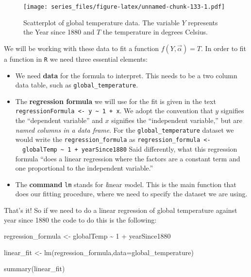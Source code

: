 \documentclass[
]{book}
\newenvironment{Shaded}{\begin{snugshade}}{\end{snugshade}}
\newcommand{\AttributeTok}[1]{\textcolor[rgb]{0.77,0.63,0.00}{#1}}
\newcommand{\DecValTok}[1]{\textcolor[rgb]{0.00,0.00,0.81}{#1}}
\newcommand{\FunctionTok}[1]{\textcolor[rgb]{0.00,0.00,0.00}{#1}}
\newcommand{\NormalTok}[1]{#1}
\newcommand{\OtherTok}[1]{\textcolor[rgb]{0.56,0.35,0.01}{#1}}
\newcommand{\SpecialCharTok}[1]{\textcolor[rgb]{0.00,0.00,0.00}{#1}}
\providecommand{\tightlist}{%
  \setlength{\itemsep}{0pt}\setlength{\parskip}{0pt}}
\theoremstyle{definition}
\theoremstyle{definition}
\theoremstyle{definition}
\theoremstyle{remark}
\begin{document}
\begin{figure}
\centering
\texttt{[image: series\_files/figure-latex/unnamed-chunk-133-1.pdf]}
\caption{\label{fig:unnamed-chunk-133}Scatterplot of global temperature data. The variable \(Y\) represents the Year since 1880 and \(T\) the temperature in degrees Celsius.}
\end{figure}

We will be working with these data to fit a function \(f(Y,\vec{\alpha})=T\). In order to fit a function in \texttt{R} we need three essential elements:

\begin{itemize}
\tightlist
\item
  We need \textbf{data} for the formula to interpret. This needs to be a two column data table, such as \texttt{global\_temperature}.
\item
  The \textbf{regression formula} we will use for the fit is given in the text \texttt{regressionFormula\ \textless{}-\ y\ \textasciitilde{}\ 1\ +\ x}. We adopt the convention that \(y\) signifies the ``dependent variable'' and \(x\) signifies the ``independent variable,'' but are \emph{named columns in a data frame}. For the \texttt{global\_temperature} dataset we would write the \texttt{regression\_formula} as \texttt{regression\_formula\ \textless{}-\ \ globalTemp\ \textasciitilde{}\ 1\ +\ yearSince1880} Said differently, what this regression formula ``does a linear regression where the factors are a constant term and one proportional to the independent variable.''
\item
  The \textbf{command} \texttt{lm} stands for \emph{l}inear \emph{m}odel. This is the main function that does our fitting procedure, where we need to specify the dataset we are using.
\end{itemize}

That's it! So if we need to do a linear regression of global temperature against year since 1880 the code to do this is the following:

\begin{Shaded}
\begin{Highlighting}[]
\NormalTok{regression\_formula }\OtherTok{\textless{}{-}}\NormalTok{  globalTemp }\SpecialCharTok{\textasciitilde{}} \DecValTok{1} \SpecialCharTok{+}\NormalTok{ yearSince1880}

\NormalTok{linear\_fit }\OtherTok{\textless{}{-}} \FunctionTok{lm}\NormalTok{(regression\_formula,}\AttributeTok{data=}\NormalTok{global\_temperature)}

\FunctionTok{summary}\NormalTok{(linear\_fit)}
\end{Highlighting}
\end{Shaded}
\end{document}
